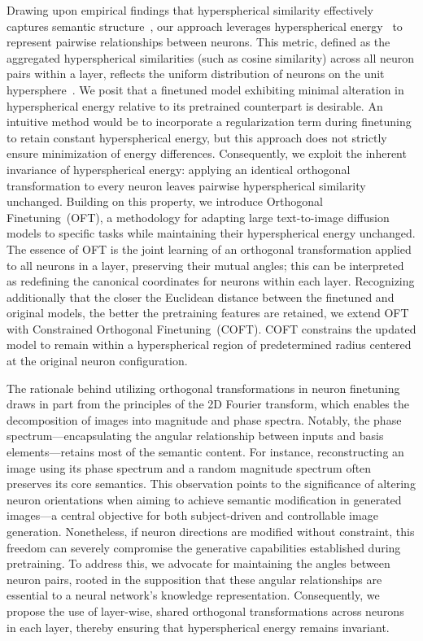 Drawing upon empirical findings that hyperspherical similarity effectively captures semantic structure~\cite{liu2017deep,liu2018decoupled,chen2020angular}, our approach leverages hyperspherical energy~\cite{liu2018learning} to represent pairwise relationships between neurons. This metric, defined as the aggregated hyperspherical similarities (such as cosine similarity) across all neuron pairs within a layer, reflects the uniform distribution of neurons on the unit hypersphere~\cite{liu2021learning}. We posit that a finetuned model exhibiting minimal alteration in hyperspherical energy relative to its pretrained counterpart is desirable. An intuitive method would be to incorporate a regularization term during finetuning to retain constant hyperspherical energy, but this approach does not strictly ensure minimization of energy differences. Consequently, we exploit the inherent invariance of hyperspherical energy: applying an identical orthogonal transformation to every neuron leaves pairwise hyperspherical similarity unchanged. Building on this property, we introduce Orthogonal Finetuning~(OFT), a methodology for adapting large text-to-image diffusion models to specific tasks while maintaining their hyperspherical energy unchanged. The essence of OFT is the joint learning of an orthogonal transformation applied to all neurons in a layer, preserving their mutual angles; this can be interpreted as redefining the canonical coordinates for neurons within each layer. Recognizing additionally that the closer the Euclidean distance between the finetuned and original models, the better the pretraining features are retained, we extend OFT with Constrained Orthogonal Finetuning~(COFT). COFT constrains the updated model to remain within a hyperspherical region of predetermined radius centered at the original neuron configuration.

The rationale behind utilizing orthogonal transformations in neuron finetuning draws in part from the principles of the 2D Fourier transform, which enables the decomposition of images into magnitude and phase spectra. Notably, the phase spectrum—encapsulating the angular relationship between inputs and basis elements—retains most of the semantic content. For instance, reconstructing an image using its phase spectrum and a random magnitude spectrum often preserves its core semantics. This observation points to the significance of altering neuron orientations when aiming to achieve semantic modification in generated images—a central objective for both subject-driven and controllable image generation. Nonetheless, if neuron directions are modified without constraint, this freedom can severely compromise the generative capabilities established during pretraining. To address this, we advocate for maintaining the angles between neuron pairs, rooted in the supposition that these angular relationships are essential to a neural network’s knowledge representation. Consequently, we propose the use of layer-wise, shared orthogonal transformations across neurons in each layer, thereby ensuring that hyperspherical energy remains invariant.

